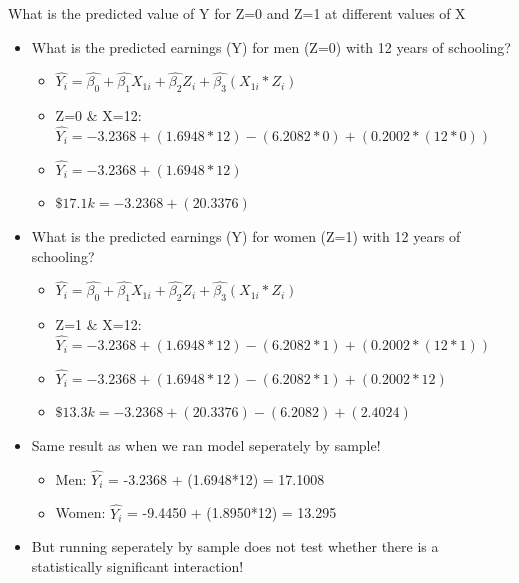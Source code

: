 \documentclass[8pt,ignorenonframetext,dvipsnames]{beamer}
\providecommand{\tightlist}{%
  \setlength{\itemsep}{0pt}\setlength{\parskip}{0pt}}
\let\olditem\item
\renewcommand{\item}{%
  \olditem\vspace{4pt}
}
\begin{document}
\begin{frame}{What is the predicted value of Y for Z=0 and Z=1 at
different values of X}
\protect\hypertarget{what-is-the-predicted-value-of-y-for-z0-and-z1-at-different-values-of-x}{}

\begin{itemize}
\tightlist
\item
  What is the predicted earnings (Y) for men (Z=0) with 12 years of
  schooling?

  \begin{itemize}
  \tightlist
  \item
    \(\hat{Y_i} = \hat{\beta_0} + \hat{\beta_1}X_{1i} + \hat{\beta_2}Z_i + \hat{\beta_3}(X_{1i}*Z_i)\)
  \item
    Z=0 \& X=12:
    \(\hat{Y_i} = -3.2368 + (1.6948*12) - (6.2082*0) + (0.2002*(12*0))\)
  \item
    \(\hat{Y_i} = -3.2368 + (1.6948*12)\)
  \item
    \(\$17.1k = -3.2368 + (20.3376)\)
  \end{itemize}
\end{itemize}

\medskip

\begin{itemize}
\tightlist
\item
  What is the predicted earnings (Y) for women (Z=1) with 12 years of
  schooling?

  \begin{itemize}
  \tightlist
  \item
    \(\hat{Y_i} = \hat{\beta_0} + \hat{\beta_1}X_{1i} + \hat{\beta_2}Z_i + \hat{\beta_3}(X_{1i}*Z_i)\)
  \item
    Z=1 \& X=12:
    \(\hat{Y_i} = -3.2368 + (1.6948*12) - (6.2082*1) + (0.2002*(12*1))\)
  \item
    \(\hat{Y_i} = -3.2368 + (1.6948*12) - (6.2082*1) + (0.2002*12)\)
  \item
    \(\$13.3k = -3.2368 + (20.3376) - (6.2082) + (2.4024)\)
  \end{itemize}
\end{itemize}

\medskip

\begin{itemize}
\tightlist
\item
  Same result as when we ran model seperately by sample!

  \begin{itemize}
  \tightlist
  \item
    Men: \(\hat{Y_i}\) = -3.2368 + (1.6948*12) = 17.1008
  \item
    Women: \(\hat{Y_i}\) = -9.4450 + (1.8950*12) = 13.295
  \end{itemize}
\item
  But running seperately by sample does not test whether there is a
  statistically significant interaction!
\end{itemize}

\end{frame}
\end{document}
